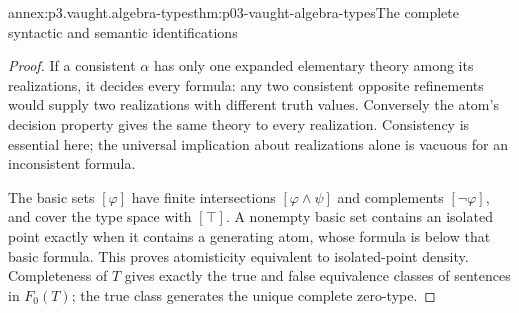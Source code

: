 \begin{annexitem}{annex:p3.vaught.algebra-types}{thm:p03-vaught-algebra-types}{The complete syntactic and semantic identifications}
\begin{proof}
If a consistent \(\alpha\) has only one expanded elementary theory
among its realizations, it decides every formula: any two consistent
opposite refinements would supply two realizations with different
truth values. Conversely the atom's decision property gives the
same theory to every realization. Consistency is essential here;
the universal implication about realizations alone is vacuous for
an inconsistent formula.

The basic sets \([\varphi]\) have finite intersections
\([\varphi\land\psi]\) and complements \([\neg\varphi]\), and cover
the type space with \([\top]\). A nonempty basic set contains an
isolated point exactly when it contains a generating atom, whose
formula is below that basic formula. This proves atomisticity
equivalent to isolated-point density. Completeness of \(T\) gives
exactly the true and false equivalence classes of sentences in
\(F_0(T)\); the true class generates the unique complete zero-type.
\end{proof}
\end{annexitem}

